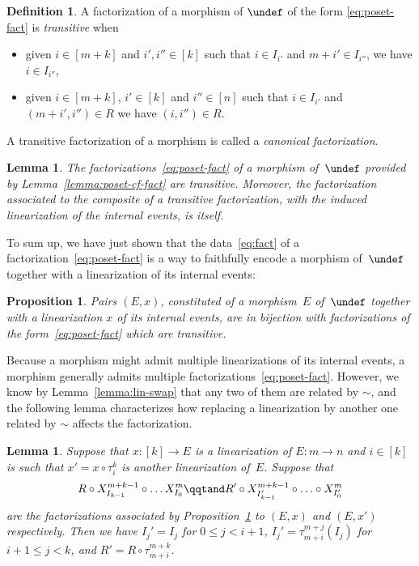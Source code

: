 \documentclass[submission,copyright,creativecommons]{eptcs}
\let\P\undef
\newtheorem{proposition}[theorem]{Proposition}
\newtheorem{lemma}[theorem]{Lemma}
\theoremstyle{definition}
\newtheorem{definition}[theorem]{Definition}
\theoremstyle{remark}
\renewcommand{\leq}{\leqslant}
\begin{document}
\begin{definition}
  \label{def:cf-trans}
  A factorization of a morphism of $\P$ of the form \eqref{eq:poset-fact} is
  \emph{transitive} when
  \begin{itemize}
  \item given $i\in[m+k]$ and $i',i''\in[k]$ such that $i\in I_{i'}$ and
    $m+i'\in I_{i''}$, we have $i\in I_{i''}$,
  \item given $i\in[m+k]$, $i'\in[k]$ and $i''\in[n]$ such that $i\in I_{i'}$ and
    $(m+i',i'')\in R$ we have $(i,i'')\in R$.
  \end{itemize}
A transitive factorization of a morphism is called a \emph{canonical
    factorization}.
\end{definition}

\begin{lemma}
  The factorizations~\eqref{eq:poset-fact} of a morphism of~$\P$ provided by
  Lemma~\ref{lemma:poset-cf-fact} are transitive. Moreover, the factorization
  associated to the composite of a transitive factorization, with the induced
  linearization of the internal events, is itself.
\end{lemma}

\noindent
To sum up, we have just shown that the data~\eqref{eq:fact} of a
factorization~\eqref{eq:poset-fact} is a way to faithfully encode a morphism
of~$\P$ together with a linearization of its internal events:

\begin{proposition}
  \label{prop:poset-lin-cf}
  Pairs $(E,x)$, constituted of a morphism~$E$ of~$\P$ together with a
  linearization $x$ of its internal events, are in bijection with factorizations
  of the form~\eqref{eq:poset-fact} which are transitive.
\end{proposition}

Because a morphism might admit multiple linearizations of its internal events, a
morphism generally admits multiple
factorizations~\eqref{eq:poset-fact}. However, we know by
Lemma~\ref{lemma:lin-swap} that any two of them are related by $\sim$, and the
following lemma characterizes how replacing a linearization by another one
related by $\sim$ affects the factorization.

\begin{lemma}
  \label{lemma:P-switch}
  Suppose that $x:[k]\to E$ is a linearization of $E:m\to n$ and $i\in[k]$ is
  such that $x'=x\circ\tau^k_i$ is another linearization of~$E$. Suppose that
  \[
  R\circ X^{m+k-1}_{I_{k-1}}\circ\ldots X^m_{I_0}
  \qqtand
  R'\circ X^{m+k-1}_{I'_{k-1}}\circ\ldots\circ X^m_{I'_0}
  \]
  are the factorizations associated by Proposition~\ref{prop:poset-lin-cf} to
  $(E,x)$ and $(E,x')$ respectively. Then we have $I_j'=I_j$ for $0\leq j<i+1$,
  $I_j'=\tau^{m+j}_{m+i}(I_j)$ for $i+1\leq j<k$, and
  $R'=R\circ\tau^{m+k}_{m+i}$.
\end{lemma}
\end{document}

